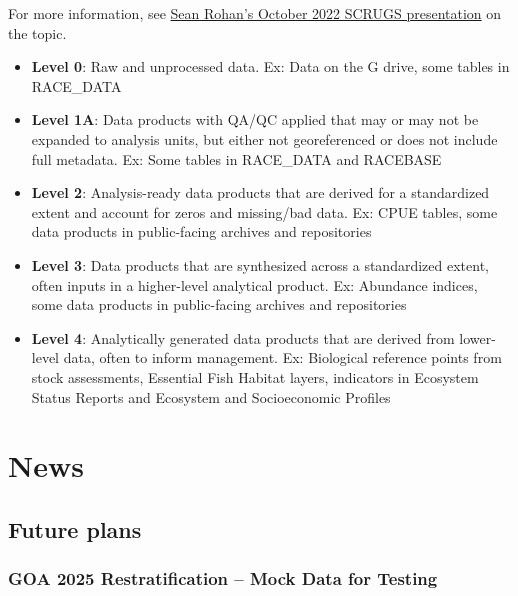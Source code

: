 \documentclass[
  letterpaper,
  oneside,
  open=any]{scrbook}
\providecommand{\tightlist}{%
  \setlength{\itemsep}{0pt}\setlength{\parskip}{0pt}}\usepackage{longtable,booktabs,array}
\begin{document}
For more information, see
\href{https://docs.google.com/presentation/d/1rWSZpeghWJqzWMIa5oBc4BCoy-zy1Yue86RoTw58u6M/edit?usp=sharing}{Sean
Rohan's October 2022 SCRUGS presentation} on the topic.

\begin{itemize}
\tightlist
\item
  \textbf{Level 0}: Raw and unprocessed data. Ex: Data on the G drive,
  some tables in RACE\_DATA
\item
  \textbf{Level 1A}: Data products with QA/QC applied that may or may
  not be expanded to analysis units, but either not georeferenced or
  does not include full metadata. Ex: Some tables in RACE\_DATA and
  RACEBASE
\item
  \textbf{Level 2}: Analysis-ready data products that are derived for a
  standardized extent and account for zeros and missing/bad data. Ex:
  CPUE tables, some data products in public-facing archives and
  repositories
\item
  \textbf{Level 3}: Data products that are synthesized across a
  standardized extent, often inputs in a higher-level analytical
  product. Ex: Abundance indices, some data products in public-facing
  archives and repositories
\item
  \textbf{Level 4}: Analytically generated data products that are
  derived from lower-level data, often to inform management. Ex:
  Biological reference points from stock assessments, Essential Fish
  Habitat layers, indicators in Ecosystem Status Reports and Ecosystem
  and Socioeconomic Profiles
\end{itemize}

\hypertarget{news}{%
\chapter{News}\label{news}}

\hypertarget{future-plans}{%
\section{Future plans}\label{future-plans}}

\hypertarget{goa-2025-restratification-mock-data-for-testing}{%
\subsection{GOA 2025 Restratification -- Mock Data for
Testing}\label{goa-2025-restratification-mock-data-for-testing}}
\end{document}

